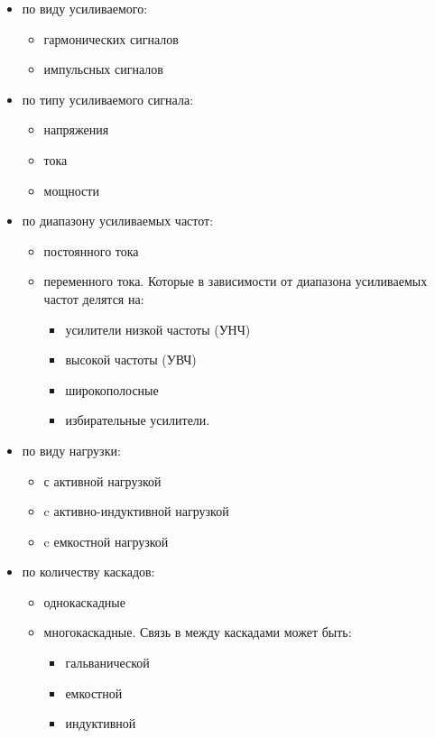 \documentclass[unicode, 12pt, a4paper, oneside]{article}
\begin{document}
\begin{itemize}
\item по виду усиливаемого:
	\begin{itemize}
	\item гармонических сигналов
	\item импульсных сигналов
	\end{itemize}
\item по типу усиливаемого сигнала:
	\begin{itemize}
	\item напряжения
	\item тока 
	\item мощности
	\end{itemize}
\item по диапазону усиливаемых частот:
	\begin{itemize}
	\item постоянного тока 
	\item переменного тока. Которые в зависимости от диапазона усиливаемых частот делятся на:
		\begin{itemize}
		\item усилители низкой частоты (УНЧ)
		\item высокой частоты (УВЧ)
		\item широкополосные
		\item избирательные усилители.
		\end{itemize}
	\end{itemize}
\item по виду нагрузки:
	\begin{itemize}
	\item с активной нагрузкой
	\item c активно-индуктивной нагрузкой
	\item c емкостной нагрузкой
	\end{itemize}
\item по количеству каскадов:
	\begin{itemize}
	\item однокаскадные 
	\item многокаскадные. Связь в между каскадами может быть:
		\begin{itemize}
		\item гальванической
		\item емкостной
		\item индуктивной
		\end{itemize}
	\end{itemize}
\end{itemize}
\end{document}
